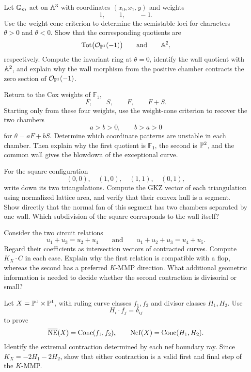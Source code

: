\begin{exercises}

\item Let \(\mathbb{G}_{m}\) act on \(\mathbb{A}^3\) with coordinates \((x_0,x_1,y)\)
and weights
\[
1,\qquad1,\qquad-1.
\]
Use the weight-cone criterion to determine the semistable loci for
characters \(\theta>0\) and \(\theta<0\).  Show that the corresponding
quotients are
\[
\operatorname{Tot}\bigl(\mathcal O_{\mathbb{P}^1}(-1)\bigr)
\qquad\text{and}\qquad
\mathbb{A}^2,
\]
respectively.  Compute the invariant ring at \(\theta=0\), identify
the wall quotient with \(\mathbb{A}^2\), and explain why the wall morphism
from the positive chamber contracts the zero section of
\(\mathcal O_{\mathbb{P}^1}(-1)\).

\item Return to the Cox weights of \(\mathbb F_1\),
\[
F,\qquad S,\qquad F,\qquad F+S.
\]
Starting only from these four weights, use the weight-cone criterion
to recover the two chambers
\[
a>b>0,
\qquad
b>a>0
\]
for \(\theta=aF+bS\).  Determine which coordinate patterns are
unstable in each chamber.  Then explain why the first quotient is
\(\mathbb F_1\), the second is \(\mathbb{P}^2\), and the common wall gives
the blowdown of the exceptional curve.

\item For the square configuration
\[
(0,0),\quad(1,0),\quad(1,1),\quad(0,1),
\]
write down its two triangulations.  Compute the GKZ vector of each
triangulation using normalized lattice area, and verify that their
convex hull is a segment.  Show directly that the normal fan of this
segment has two chambers separated by one wall.  Which subdivision of
the square corresponds to the wall itself?

\item Consider the two circuit relations
\[
u_1+u_3=u_2+u_4
\qquad\text{and}\qquad
u_1+u_2+u_3=u_4+u_5.
\]
Regard their coefficients as intersection vectors of contracted
curves.  Compute \(K_X\cdot C\) in each case.  Explain why the first
relation is compatible with a flop, whereas the second has a preferred
\(K\)-MMP direction.  What additional geometric information is needed
to decide whether the second contraction is divisorial or small?

\item Let \(X=\mathbb{P}^1\times\mathbb{P}^1\), with ruling curve classes
\(f_1,f_2\) and divisor classes \(H_1,H_2\).  Use
\[
H_i\cdot f_j=\delta_{ij}
\]
to prove
\[
\overline{\operatorname{NE}}(X)=\operatorname{Cone}(f_1,f_2),
\qquad
\operatorname{Nef}(X)=\operatorname{Cone}(H_1,H_2).
\]
Identify the extremal contraction determined by each nef boundary
ray.  Since \(K_X=-2H_1-2H_2\), show that either contraction is a
valid first and final step of the \(K\)-MMP.


\end{exercises}
